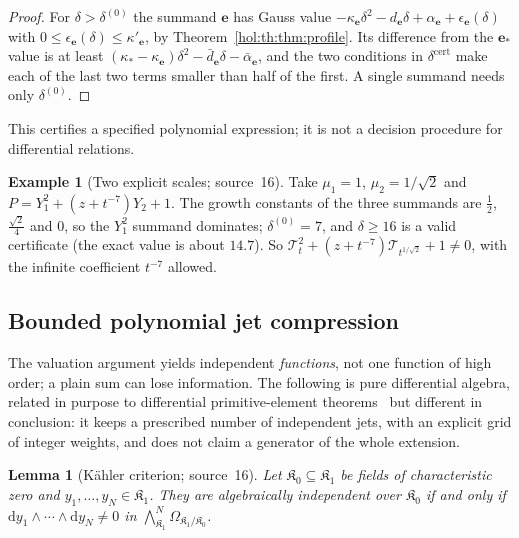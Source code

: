 \documentclass[11pt]{article}
\numberwithin{equation}{section}
\newtheorem{lemma}[theorem]{Lemma}
\theoremstyle{definition}
\newtheorem{example}[theorem]{Example}
\theoremstyle{remark}
\begin{document}
\begin{proof}
For $\delta>\delta^{(0)}$ the summand $\mathbf e$ has Gauss value
$-\kappa_{\mathbf e}\delta^2-d_{\mathbf e}\delta+\alpha_{\mathbf e}+
\epsilon_{\mathbf e}(\delta)$ with $0\le\epsilon_{\mathbf e}(\delta)\le
\kappa'_{\mathbf e}$, by Theorem~\ref{hol:th:thm:profile}. Its difference from
the $\mathbf e_*$ value is at least $(\kappa_*-\kappa_{\mathbf e})\delta^2-
\bar d_{\mathbf e}\delta-\bar\alpha_{\mathbf e}$, and the two conditions in
$\delta^{\mathrm{cert}}$ make each of the last two terms smaller than half of
the first. A single summand needs only $\delta^{(0)}$.
\end{proof}

This certifies a specified polynomial expression; it is not a decision
procedure for differential relations.

\begin{example}[Two explicit scales; source~16]\label{hol:th:ex:two}
Take $\mu_1=1$, $\mu_2=1/\sqrt2$ and $P=Y_1^2+(z+t^{-7})Y_2+1$. The growth
constants of the three summands are $\frac12$, $\frac{\sqrt2}4$ and $0$, so
the $Y_1^2$ summand dominates; $\delta^{(0)}=7$, and $\delta\ge16$ is a valid
certificate (the exact value is about $14.7$). So
$\mathcal T_t^2+(z+t^{-7})\mathcal T_{t^{1/\sqrt2}}+1\ne0$, with the infinite
coefficient $t^{-7}$ allowed.
\end{example}

\subsection{Bounded polynomial jet compression}
\label{hol:th:sub:compression}

The valuation argument yields independent \emph{functions}, not one function
of high order; a plain sum can lose information. The following is pure
differential algebra, related in purpose to differential primitive-element
theorems~\cite{pogudin2014,pogudin2018} but different in conclusion: it keeps
a prescribed number of independent jets, with an explicit grid of integer
weights, and does not claim a generator of the whole extension.

\begin{lemma}[K\"ahler criterion; source~16]\label{hol:th:lem:kahler}
Let $\mathfrak K_0\subseteq\mathfrak K_1$ be fields of characteristic zero and
$y_1,\ldots,y_N\in\mathfrak K_1$. They are algebraically independent over
$\mathfrak K_0$ if and only if $\mathrm dy_1\wedge\cdots\wedge\mathrm dy_N\ne0$
in $\bigwedge^N_{\mathfrak K_1}\Omega_{\mathfrak K_1/\mathfrak K_0}$.
\end{lemma}
\end{document}
